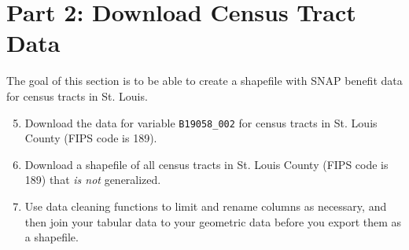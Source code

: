 \documentclass{tufte-handout}
\begin{document}
\vspace{5mm}
\section{Part 2: Download Census Tract Data}
The goal of this section is to be able to create a shapefile with SNAP benefit data for census tracts in St. Louis.
\begin{enumerate}
\setcounter{enumi}{4}
\item Download the data for variable \texttt{B19058\_002} for census tracts in St. Louis County (FIPS code is 189).
\item Download a shapefile of all census tracts in St. Louis County (FIPS code is 189) that \textit{is not} generalized. 
\item Use data cleaning functions to limit and rename columns as necessary, and then join your tabular data to your geometric data before you export them as a shapefile.
\end{enumerate}

\end{document}
